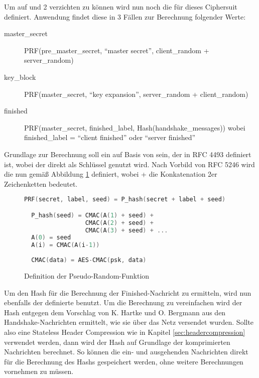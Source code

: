 Um auf  und 2 verzichten zu können wird nun noch die  für dieses Ciphersuit definiert.
Anwendung findet diese in 3 Fällen zur Berechnung folgender Werte:
\begin{description}
  \item[master\_secret] PRF(pre\_master\_secret, "`master secret"', client\_random + server\_random)
  \item[key\_block] PRF(master\_secret, "`key expansion"', server\_random + client\_random)
  \item[finished] PRF(master\_secret, finished\_label, Hash(handshake\_messages)) \newline wobei finished\_label = "`client finished"' oder "`server finished"'
\end{description}
Grundlage zur Berechnung soll ein  auf Basis von  sein, der in RFC 4493 \cite{rfc4493} definiert ist, wobei der  direkt als Schlüssel genutzt wird.
Nach Vorbild von RFC 5246 \cite{rfc5246} wird die  nun gemäß Abbildung \ref{fig:def_psr} definiert, wobei
+ die Konkatenation 2er Zeichenketten bedeutet.
\begin{figure}[ht]
  \centering
  \begin{lstlisting}[language=c]
  PRF(secret, label, seed) = P_hash(secret + label + seed)

  P_hash(seed) = CMAC(A(1) + seed) +
                 CMAC(A(2) + seed) +
                 CMAC(A(3) + seed) + ...
  A(0) = seed
  A(i) = CMAC(A(i-1))
  
  CMAC(data) = AES-CMAC(psk, data)
  \end{lstlisting}
  \caption{Definition der Pseudo-Random-Funktion}
  \label{fig:def_psr}
\end{figure}

Um den Hash für die Berechnung der Finished-Nachricht zu ermitteln, wird nun ebenfalls der definierte  benutzt.
Um die Berechnung zu vereinfachen wird der Hash entgegen dem Vorschlag von K. Hartke und O. Bergmann \cite{draftcodtls} aus den
Handshake-Nachrichten ermittelt, wie sie über das Netz versendet wurden. Sollte also eine Stateless Header Compression wie in Kapitel
\ref{sec:headercompression} verwendet werden, dann wird der Hash auf Grundlage der komprimierten Nachrichten berechnet. So können
die ein- und ausgehenden Nachrichten direkt für die Berechnung des Hashs gespeichert werden, ohne weitere Berechnungen vornehmen zu müssen.